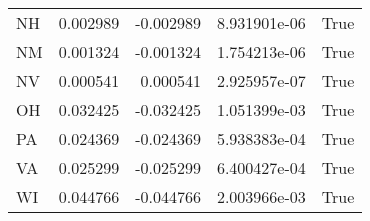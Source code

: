 \begin{table}
\begin{tabular}{lrrrl}
      NH &   0.002989 & -0.002989 &   8.931901e-06 &          True \\
      NM &   0.001324 & -0.001324 &   1.754213e-06 &          True \\
      NV &   0.000541 &  0.000541 &   2.925957e-07 &          True \\
      OH &   0.032425 & -0.032425 &   1.051399e-03 &          True \\
      PA &   0.024369 & -0.024369 &   5.938383e-04 &          True \\
      VA &   0.025299 & -0.025299 &   6.400427e-04 &          True \\
      WI &   0.044766 & -0.044766 &   2.003966e-03 &          True \\
\bottomrule
\end{tabular}
\end{table}
